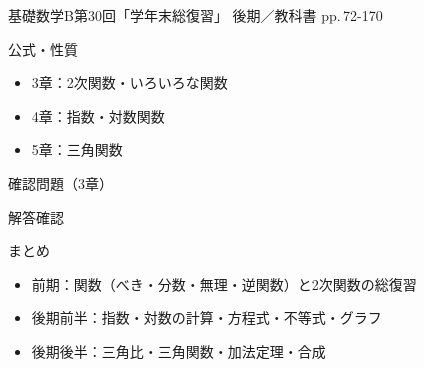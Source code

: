 \documentclass[aspectratio=43,professionalfonts,handout]{beamer}
\newcommand{\LectureNum}{30}
\newcommand{\LectureTitle}{学年末総復習}
\newcommand{\TextPages}{pp.\,72-170}
\newcommand{\CourseName}{基礎数学B}
\renewcommand{\TermName}{後期}
\begin{document}
\begin{frame}{\CourseName\quad 第\LectureNum 回「\LectureTitle 」}
  {\small \TermName\quad \TeacherName\quad ／\quad 教科書 \TextPages}

\end{frame}

\begin{frame}{公式・性質}
  \begin{block}{}
  \begin{itemize}
    \item 3章：2次関数・いろいろな関数
    \item 4章：指数・対数関数
    \item 5章：三角関数
  \end{itemize}
  \end{block}
\end{frame}

\begin{frame}{確認問題（3章）}
\end{frame}

\begin{frame}{解答確認}
\end{frame}

\begin{frame}{まとめ}
  \begin{itemize}
    \item 前期：関数（べき・分数・無理・逆関数）と2次関数の総復習
    \item 後期前半：指数・対数の計算・方程式・不等式・グラフ
    \item 後期後半：三角比・三角関数・加法定理・合成
  \end{itemize}
\end{frame}
\end{document}
